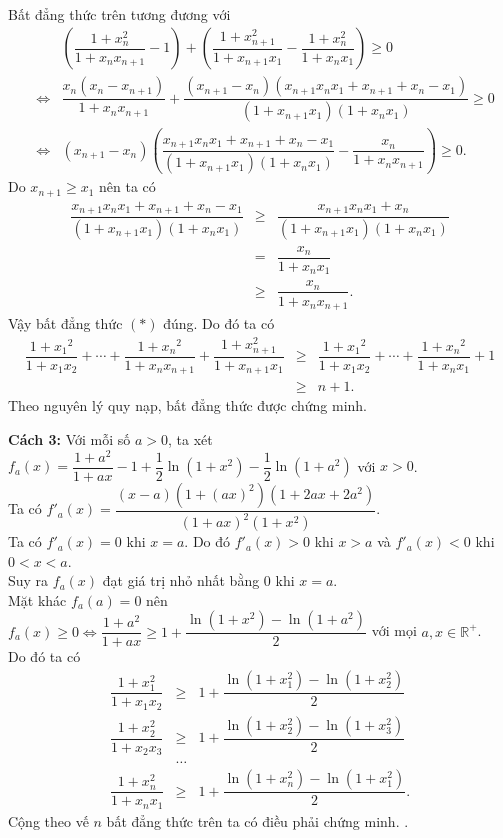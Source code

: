 \begin{ex}
{\begin{itemize}
			\\ Bất đẳng thức trên tương đương với 
			{\allowdisplaybreaks 
			\begin{eqnarray*}
			& & \left( \dfrac{1+x_n^2}{1+ x_nx_{n+1}} - 1 \right) + \left( \dfrac{1+x_{n+1}^2}{1+ x_{n+1}x_1} - \dfrac{1+x_n^2}{1+ x_nx_1} \right) \geq 0 \\
			& \Leftrightarrow& \dfrac{x_n (x_n - x_{n+1}) }{1+x_nx_{n+1}} + \dfrac{(x_{n+1} -x_n) (x_{n+1}x_nx_1 + x_{n+1} +x_n - x_1)}{(1+x_{n+1}x_1) (1+x_nx_1) } \geq 0 \\
			& \Leftrightarrow & (x_{n+1} -x_n) \left( \dfrac{x_{n+1}x_nx_1 + x_{n+1} + x_n -x_1}{(1+x_{n+1}x_1) (1+x_nx_1) } - \dfrac{x_n}{1+x_nx_{n+1}} \right) \geq 0.
			\end{eqnarray*}}
		Do $x_{n+1} \geq x_1$ nên ta có 
		{\allowdisplaybreaks
		\begin{eqnarray*}
			\dfrac{x_{n+1}x_nx_1 + x_{n+1} + x_n -x_1}{(1+x_{n+1}x_1) (1+x_nx_1) } & \geq & \dfrac{x_{n+1}x_nx_1 + x_n}{(1+x_{n+1}x_1) (1+x_nx_1)} \\
			& = & \dfrac{x_n}{1+x_nx_1} \\
			& \geq & \dfrac{x_n}{1+ x_nx_{n+1}}.
		\end{eqnarray*}}
		Vậy bất đẳng thức $(*)$ đúng. Do đó ta có
		{\allowdisplaybreaks
		\begin{eqnarray*}
			\dfrac{1+{x_1}^2}{1+x_1x_2}+  \cdots + \dfrac{1+{x_n}^2}{1+x_nx_{n+1}} + \dfrac{1+x_{n+1}^2}{1+x_{n+1}x_1} &\geq &  \dfrac{1+{x_1}^2}{1+x_1x_2}+  \cdots + \dfrac{1+{x_n}^2}{1+x_nx_{1}} +1 \\
			&\geq & n + 1.
		\end{eqnarray*}}
		Theo nguyên lý quy nạp, bất đẳng thức được chứng minh.
		\end{itemize}
		\textbf{Cách 3:} Với mỗi số $a>0$, ta xét
		$f_a(x)=\dfrac{1+a^2}{1+ax}-1+\dfrac{1}{2}\ln(1+x^2)-\dfrac{1}{2}\ln(1+a^2)$ với $x>0$.
		\\ Ta có		$f'_a(x)=\dfrac{(x-a)(1+(ax)^2)(1+2ax+2a^2)}{(1+ax)^2(1+x^2)}$.
		\\
		Ta có $f'_a(x)=0$ khi $x=a$. Do đó $f'_a(x)> 0$ khi $x>a$ và $f'_a(x)< 0$ khi $0<x<a$.
		\\ Suy ra $f_a(x)$ đạt giá trị nhỏ nhất bằng $0$ khi $x=a$.
		\\ Mặt khác $f_a(a)=0$ nên $f_a(x) \geq 0 \Leftrightarrow \dfrac{1+a^2}{1+ ax} \geq 1 + \dfrac{\ln (1+x^2) - \ln (1+ a^2)}{2}$ với mọi $a,x \in \mathbb{R}^+$.
		\\ Do đó ta có 
		\begin{eqnarray*}
		\dfrac{1+x_1^2}{1+x_1x_2} & \geq & 1 + \dfrac{\ln (1+x_1^2) - \ln (1+x_2^2)}{2} \\
		\dfrac{1+x_2^2}{1+x_2x_3} & \geq & 1 + \dfrac{\ln (1+x_2^2) - \ln (1+x_3^2)}{2} \\
		&\ldots& \\
		\dfrac{1+x_n^2}{1+x_nx_1} & \geq & 1 + \dfrac{\ln (1+x_n^2) - \ln (1+x_1^2)}{2}.
		\end{eqnarray*}
		Cộng theo vế $n$ bất đẳng thức trên ta có điều phải chứng minh.
.	}
\end{ex}


